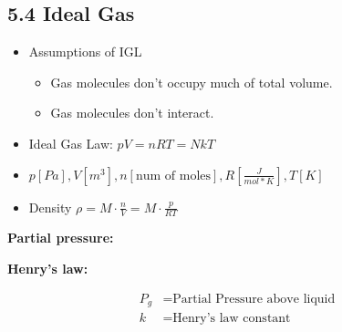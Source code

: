 \subsection{5.4 Ideal Gas}
    \begin{itemize}
        \itemsep0em
        \item Assumptions of IGL\:
        \begin{itemize}
            \itemsep0em
            \item Gas molecules don't occupy much of total volume.
            \item Gas molecules don't interact.
        \end{itemize}
        \item Ideal Gas Law: $pV = nRT=N kT$
        \item $p\left[Pa\right], V\left[m^3\right], n\left[\text{num of moles}\right], R\left[\frac{J}{mol*K}\right], T\left[K\right]$
        \item Density $\rho = M \cdot \frac{n}{V} = M \cdot \frac{p}{RT}$
    \end{itemize}

    \textbf{Partial pressure:}
    
    \textbf{Henry's law:}\\
    \begin{minipage}{0.99\linewidth}
        \begin{minipage}{0.3\linewidth}
            \vspace*{0.5em}
        \end{minipage}
        \begin{minipage}{0.69\linewidth}
            \begin{align*}
                P_g &= \text{Partial Pressure above liquid}\\
                k &= \text{Henry's law constant}
            \end{align*}
        \end{minipage}
    \end{minipage}
    \vspace*{0.2em}